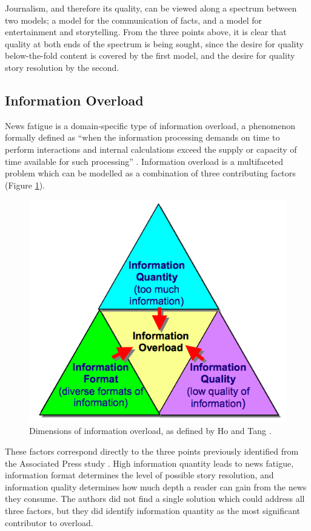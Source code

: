  Journalism, and therefore its quality, can be viewed along a spectrum between two models; a model for the communication of facts, and a model for entertainment and storytelling. From the three points above, it is clear that quality at both ends of the spectrum is being sought, since the desire for quality below-the-fold content is covered by the first model, and the desire for quality story resolution by the second.

\subsection{Information Overload \label{sec:information-overload}}

News fatigue is a domain-specific type of information overload, a phenomenon formally defined as ``when the information processing demands on time to perform interactions and internal calculations exceed the supply or capacity of time available for such processing'' \citep[p.206]{InformationOverloadATemporalApproach}. Information overload is a multifaceted problem which can be modelled as a combination of three contributing factors (Figure \ref{fig:dimensions}).

\begin{figure}[htbp!]
	\centering
	\includegraphics[width=.55\textwidth]{img/lit-survey/overload-model.png}
	\caption{Dimensions of information overload, as defined by Ho and Tang \citep{TowardsAnOptimalResolutionToInformationOverload}.}
	\label{fig:dimensions}
\end{figure}

These factors correspond directly to the three points previously identified from the Associated Press study \citep{anewmodelfornews}. High information quantity leads to news fatigue, information format determines the level of possible story resolution, and information quality determines how much depth a reader can gain from the news they consume. The authors did not find a single solution which could address all three factors, but they did identify information quantity as the most significant contributor to overload.

